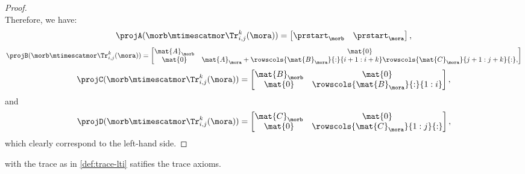 {\begin{proof}
\begin{equation*}
        \end{equation*}
        Therefore, we have:
        \begin{equation*}
            \projA(\morb \mtimescatmor \Tr_{i,j}^k(\mora))=\begin{bmatrix}\prstart_\morb &\prstart_\mora\end{bmatrix},
        \end{equation*}
        \begin{equation*}
            \projB(\morb \mtimescatmor \Tr_{i,j}^k(\mora))=\begin{bmatrix}
                \mat{A}_\morb & \mat{0}                                                                                    \\
                \mat{0}       & \mat{A}_\mora + \rowscols{\mat{B}_\mora}{:}{i+1:i+k} \rowscols{\mat{C}_\mora}{j+1:j+k}{:},
            \end{bmatrix}
        \end{equation*}
        \begin{equation*}
            \projC(\morb \mtimescatmor \Tr_{i,j}^k(\mora))=\begin{bmatrix}
                \mat{B}_\morb & \mat{0}                          \\
                \mat{0}       & \rowscols{\mat{B}_\mora}{:}{1:i}
            \end{bmatrix},
        \end{equation*}
        and
        \begin{equation*}
            \projD(\morb \mtimescatmor \Tr_{i,j}^k(\mora))=
            \begin{bmatrix}
                \mat{C}_\morb & \mat{0}                          \\
                \mat{0}       & \rowscols{\mat{C}_\mora}{1:j}{:}
            \end{bmatrix},
        \end{equation*}
        which clearly correspond to the left-hand side.
    \end{proof}
}

\begin{lemma}
    \LTI with the trace as in \cref{def:trace-lti} satifies the trace axioms.
\end{lemma}


